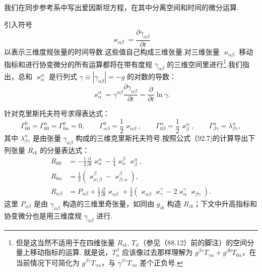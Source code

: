 我们在同步参考系中写出爱因斯坦方程，在其中分离空间和时间的微分运算.

引入符号
\begin{equation}
  \varkappa_{\alpha\beta}=\frac{\partial\gamma_{\alpha\beta}}{\partial t}
\end{equation}
以表示三维度规张量的时间导数.这些值自己构成三维张量.对三维张量 $\varkappa_{\alpha\beta}$ 移动指标和进行协变微分的所有运算都将在带有度规 $\gamma_{\alpha\beta}$ 的三维空间里进行\footnote{但是这当然不适用于在四维张量 $R_{ik}$, $T_{il}$（参见（88.12）前的脚注）的空间分量上移动指标的运算. 就是说，$T^{\beta}_{\alpha}$ 应该像过去那样理解为 $g^{\beta\gamma}T_{\gamma\alpha}+g^{\beta0}T_{0\alpha}$，在当前情况下可简化为 $g^{\beta\gamma}T_{\gamma\alpha}$，与 $\gamma^{\beta\gamma}T_{\gamma\alpha}$ 差个正负号.}.我们指出，总和 $\varkappa_{\alpha}^{\alpha}$ 是行列式 $\gamma\equiv|\gamma_{\alpha\beta}|=-g$ 的对数的导数：
\begin{equation}
  \varkappa_{\alpha}^{\alpha}
  =\gamma^{\alpha\beta}\frac{\partial\gamma_{\alpha\beta}}{\partial t}
  =\frac{\partial}{\partial t}\ln\gamma.
\end{equation}

针对克里斯托夫符号求得表达式：
\begin{equation}
  \Gamma^0_{00}=\Gamma^{\alpha}_{00}=\Gamma^0_{0\alpha}=0,\qquad
  \Gamma^0_{\alpha\beta}=\frac{1}{2}\varkappa_{\alpha\beta},\qquad
  \Gamma^{\alpha}_{0\beta}=\frac{1}{2}\varkappa_{\beta}^{\alpha},\qquad
  \Gamma^{\alpha}_{\beta\gamma}=\lambda^{\alpha}_{\beta\gamma},
\end{equation}
其中 $\lambda^{\alpha}_{\beta\gamma}$ 是由张量 $\gamma_{\alpha\beta}$ 构成的三维克里斯托夫符号.按照公式（92.7)的计算导出下列张量 $R_{ik}$ 的分量表达式：
\begin{equation}
\begin{aligned}
  R_{00}&=-\frac{1}{2}\frac{\partial}{\partial t}\varkappa_{\alpha}^{\alpha}
  -\frac{1}{4}\varkappa_{\alpha}^{\beta}\varkappa_{\beta}^{\alpha},\\
  R_{0\alpha}&=\frac{1}{2}\left(\varkappa^{\beta}_{\alpha;\beta}
  -\varkappa^{\beta}_{\beta;\alpha}\right),\\
  R_{\alpha\beta}&=P_{\alpha\beta}
  +\frac{1}{2}\frac{\partial}{\partial t}\varkappa_{\alpha\beta}
  +\frac{1}{4}\left(\varkappa_{\alpha\beta}\varkappa_{\gamma}^{\gamma}
  -2\varkappa_{\alpha}^{\gamma}\varkappa_{\beta\gamma}\right).
\end{aligned}
\end{equation}
这里 $P_{\alpha\beta}$ 是由 $\gamma_{\alpha\beta}$ 构造的三维里奇张量，如同由 $g_{ik}$ 构造 $R_{ik}$；下文中升高指标和协变微分也是用三维度规 $\gamma_{\alpha\beta}$ 进行.

